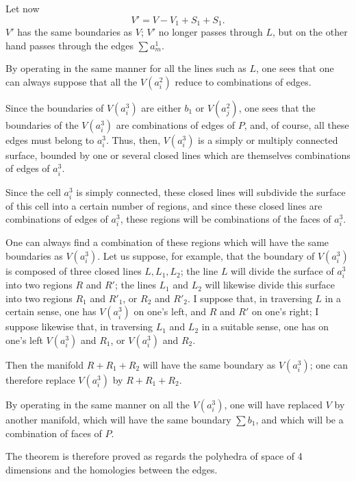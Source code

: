 \documentclass{article}
\begin{document}
Let now
\[ V' = V - V_{1} + S_{1} + S_{1}. \]
$V'$ has the same boundaries as $V$; $V'$ no longer passes through $L$, but on the other hand passes through the edges $\displaystyle\sum a^{1}_{m}$.

By operating in the same manner for all the lines such as $L$, one sees that one can always suppose that all the $V(a^{2}_{i})$ reduce to combinations of edges.

Since the boundaries of $V(a^{3}_{i})$ are either $b_{1}$ or $V(a^{2}_{j})$, one sees that the boundaries of the $V(a^{3}_{i})$ are combinations of edges of $P$, and, of course, all these edges must belong to $a^{3}_{i}$. Thus, then, $V(a^{3}_{i})$ is a simply or multiply connected surface, bounded by one or several closed lines which are themselves combinations of edges of $a^{3}_{i}$.

Since the cell $a^{3}_{i}$ is simply connected, these closed lines will subdivide the surface of this cell into a certain number of regions, and since these closed lines are combinations of edges of $a^{3}_{i}$, these regions will be combinations of the faces of $a^{3}_{i}$.

One can always find a combination of these regions which will have the same boundaries as $V(a^{3}_{i})$. Let us suppose, for example, that the boundary of $V(a^{3}_{i})$ is composed of three closed lines $L, L_{1}, L_{2}$; the line $L$ will divide the surface of $a^{3}_{i}$ into two regions $R$ and $R'$; the lines $L_{1}$ and $L_{2}$ will likewise divide this surface into two regions $R_{1}$ and $R'_{1}$, or $R_{2}$ and $R'_{2}$. I suppose that, in traversing $L$ in a certain sense, one has $V(a^{3}_{i})$ on one's left, and $R$ and $R'$ on one's right; I suppose likewise that, in traversing $L_{1}$ and $L_{2}$ in a suitable sense, one has on one's left $V(a^{3}_{i})$ and $R_{1}$, or $V(a^{3}_{i})$ and $R_{2}$.

Then the manifold $R + R_{1} + R_{2}$ will have the same boundary as $V(a^{3}_{i})$; one can therefore replace $V(a^{3}_{i})$ by $R + R_{1} + R_{2}$.


By operating in the same manner on all the $V(a^{3}_{i})$, one will have replaced $V$ by another manifold, which will have the same boundary $\displaystyle\sum b_{1}$, and which will be a combination of faces of $P$.

The theorem is therefore proved as regards the polyhedra of space of 4 dimensions and the homologies between the edges.
\end{document}
